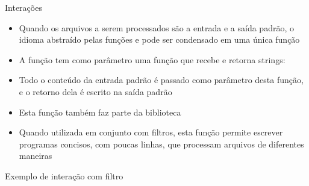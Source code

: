 \begin{frame}[fragile]{Interações}

    \begin{itemize}
        \item Quando os arquivos a serem processados são a entrada e a saída padrão, o idioma
            abstraído pelas funções  e 
            pode ser condensado em uma única função

        \item A função  tem como parâmetro uma função que recebe e retorna
            strings:


        \item Todo o conteúdo da entrada padrão é passado como parâmetro desta função, e o retorno
            dela é escrito na saída padrão

        \item Esta função também faz parte da biblioteca 

        \item Quando utilizada em conjunto com filtros, esta função permite escrever programas
            concisos, com poucas linhas, que processam arquivos de diferentes maneiras
    \end{itemize}

\end{frame}

\begin{frame}[fragile]{Exemplo de interação com filtro}
\end{frame}

